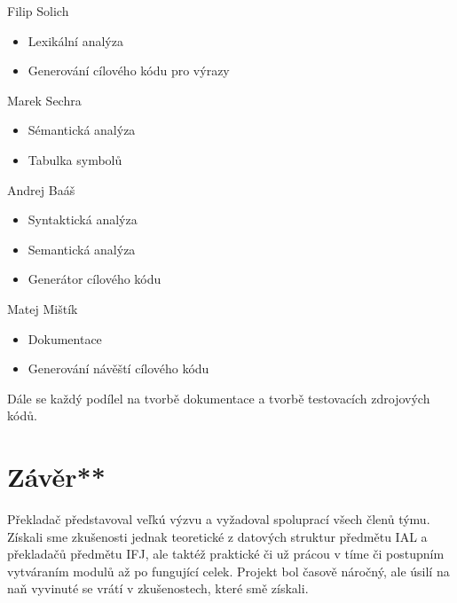 \documentclass[a4paper, 11pt]{article}
\begin{document}
	\noindent
Filip Solich
\vspace{-0.6em}
\begin{itemize}
  \item{Lexikální analýza}
  \vspace{-0.6em}
  \item{Generování cílového kódu pro výrazy}
  \vspace{-0.6em}
\end{itemize}
Marek Sechra
\vspace{-0.6em}
\begin{itemize}
  \item{Sémantická analýza}
  \vspace{-0.6em}
  \item{Tabulka symbolů}
\end{itemize}
Andrej Baáš
\vspace{-0.6em}
\begin{itemize}
  \item{Syntaktická analýza}
  \vspace{-0.6em}
  \item{Semantická analýza}
  \vspace{-0.6em}
  \item{Generátor cílového kódu}
\end{itemize}
Matej Mištík
\vspace{-0.6em}
\begin{itemize}
  \item{Dokumentace}
  \vspace{-0.6em}
  \item{Generování návěští cílového kódu }
  \vspace{-0.6em}
\end{itemize}
\bigskip
Dále se každý podílel na tvorbě dokumentace a tvorbě testovacích zdrojových kódů.
	       

	\section{Závěr**}

    Překladač představoval veľkú výzvu a vyžadoval spoluprací všech členů týmu. Získali sme zkušenosti jednak teoretické z datových struktur předmětu IAL a překladačů předmětu IFJ, ale taktéž praktické či už prácou v tíme či postupním vytváraním modulů až po fungující celek. Projekt bol časově náročný, ale úsilí na naň vyvinuté se vrátí v zkušenostech, které smě získali.
\end{document}
